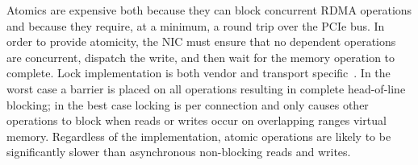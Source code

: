 Atomics are expensive both because they can block concurrent RDMA
operations and because they require, at a minimum, a round trip over
the PCIe bus.
In order to provide atomicity, the NIC must ensure
that no dependent operations are concurrent, dispatch the write, and
then wait for the memory operation to complete.
Lock implementation is both vendor and
transport specific~\cite{design-guidelines}. In the worst case a
barrier is placed on all operations resulting in complete head-of-line
blocking; in the best case locking is per connection and only causes
other operations to block when reads or writes occur on overlapping
ranges virtual memory. Regardless of the implementation, atomic
operations are likely to be significantly slower than asynchronous non-blocking
reads and writes.





